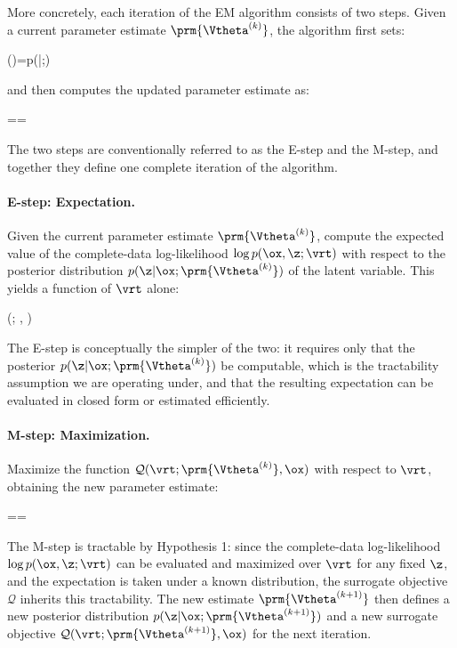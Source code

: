 More concretely, each iteration of the EM algorithm consists of two steps. Given a current parameter estimate $\prm{\Vtheta^{(k)}}$, the algorithm first sets:
\begin{myequation}
  (\z)=p(\z|\ox;)
\end{myequation}
and then computes the updated parameter estimate as:
\begin{myequation}
==
\end{myequation}
The two steps are conventionally referred to as the \alert{E-step} and the \alert{M-step}, and together they define one complete iteration of the algorithm.

\paragraph{E-step: Expectation.} Given the current parameter estimate $\prm{\Vtheta^{(k)}}$, compute the expected value of the complete-data log-likelihood $\log p(\ox,\z;\vrt)$ with respect to the posterior distribution $p(\z|\ox;\prm{\Vtheta^{(k)}})$ of the latent variable. This yields a function of $\vrt$ alone:
\begin{myequation}
  (\vrt; , \ox)  {}
\end{myequation}
The E-step is conceptually the simpler of the two: it requires only that the posterior $p(\z|\ox;\prm{\Vtheta^{(k)}})$ be computable, which is the tractability assumption we are operating under, and that the resulting expectation can be evaluated in closed form or estimated efficiently.

\paragraph{M-step: Maximization.} Maximize the function $\mathcal{Q}(\vrt; \prm{\Vtheta^{(k)}}, \ox)$ with respect to $\vrt$, obtaining the new parameter estimate:
\begin{myequation}
  ==
\end{myequation}
The M-step is tractable by Hypothesis 1: since the complete-data log-likelihood $\log p(\ox,\z;\vrt)$ can be evaluated and maximized over $\vrt$ for any fixed $\z$, and the expectation is taken under a known distribution, the surrogate objective $\mathcal{Q}$ inherits this tractability. The new estimate $\prm{\Vtheta^{(k+1)}}$ then defines a new posterior distribution $p(\z|\ox;\prm{\Vtheta^{(k+1)}})$ and a new surrogate objective $\mathcal{Q}(\vrt;\prm{\Vtheta^{(k+1)}},\ox)$ for the next iteration.

